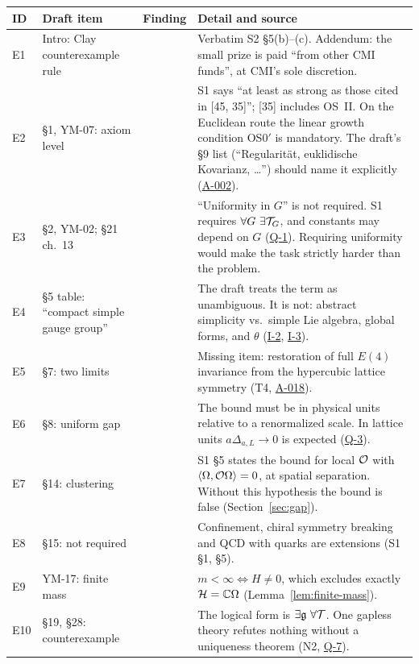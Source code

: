 \documentclass[11pt,a4paper]{article}
\newcommand{\idref}[1]{\hyperref[#1]{\textsf{#1}}}
\begin{document}
\begin{center}\small
\begin{longtable}{@{}p{0.7cm}P{2.3cm}p{1.9cm}p{10.3cm}@{}}
\toprule
ID & Draft item & Finding & Detail and source\\
\midrule\endhead
\bottomrule\endfoot
E1 & Intro: Clay counterexample rule &  & Verbatim S2 \S5(b)--(c). Addendum: the small prize is paid \enquote{from other CMI funds}, at CMI's sole discretion.\\
E2 & \S1, YM-07: axiom level &  & S1 says \enquote{at least as strong as those cited in [45, 35]}; [35] includes OS~II. On the Euclidean route the linear growth condition OS0$'$ is mandatory. The draft's \S9 list (\enquote{Regularität, euklidische Kovarianz, \dots}) should name it explicitly (\idref{A-002}).\\
E3 & \S2, YM-02; \S21 ch.~13 &  & \enquote{Uniformity in $G$} is not required. S1 requires $\forall G\ \exists\cT_G$, and constants may depend on $G$ (\idref{Q-1}). Requiring uniformity would make the task strictly harder than the problem.\\
E4 & \S5 table: \enquote{compact simple gauge group} &  & The draft treats the term as unambiguous. It is not: abstract simplicity vs.\ simple Lie algebra, global forms, and $\theta$ (\idref{I-2}, \idref{I-3}).\\
E5 & \S7: two limits &  & Missing item: restoration of full $E(4)$ invariance from the hypercubic lattice symmetry (T4, \idref{A-018}).\\
E6 & \S8: uniform gap &  & The bound must be in physical units relative to a renormalized scale. In lattice units $a\Delta_{a,L}\to0$ is expected (\idref{Q-3}).\\
E7 & \S14: clustering &  & S1 \S5 states the bound for local $\mathcal O$ with $\langle\Omega,\mathcal O\Omega\rangle=0$, at spatial separation. Without this hypothesis the bound is false (Section~\ref{sec:gap}).\\
E8 & \S15: not required &  & Confinement, chiral symmetry breaking and QCD with quarks are extensions (S1 \S1, \S5).\\
E9 & YM-17: finite mass &  & $m<\infty\iff H\neq0$, which excludes exactly $\mathcal H=\mathbb C\Omega$ (Lemma~\ref{lem:finite-mass}).\\
E10 & \S19, \S28: counterexample &  & The logical form is $\exists\mathfrak g\ \forall\mathcal T$. One gapless theory refutes nothing without a uniqueness theorem (N2, \idref{Q-7}).\\

\end{longtable}
\end{center}
\end{document}
